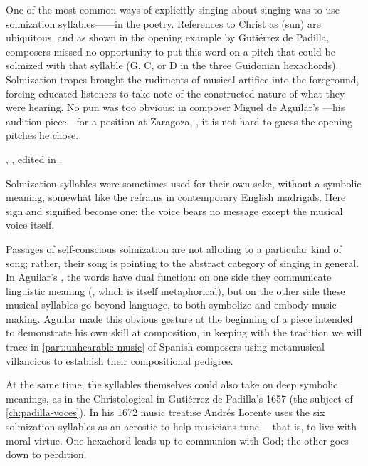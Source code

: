 One of the most common ways of explicitly singing about singing was to use
solmization syllables------in the poetry.
References to Christ as  (sun) are ubiquitous, and as shown in the
opening example by Gutiérrez de Padilla, composers missed no opportunity to put
this word on a pitch that could be solmized with that syllable (G, C, or D in
the three Guidonian hexachords).
Solmization tropes brought the rudiments of musical artifice into the
foreground, forcing educated listeners to take note of the constructed nature
of what they were hearing.
No pun was too obvious: in composer Miguel de Aguilar's ---his
audition piece---for a position at Zaragoza, , it
is not hard to guess the opening pitches he chose.%
\begin{Footnote}
    , , edited
    in \autocite[34--64]{Ezquerro:MME55}.
\end{Footnote}
Solmization syllables were sometimes used for their own sake, without a
symbolic meaning, somewhat like the  refrains in contemporary
English madrigals.
Here sign and signified become one: the voice bears no message except the
musical voice itself.

Passages of self-conscious solmization are not alluding to a particular kind of
song; rather, their song is pointing to the abstract category of
singing in general.
In Aguilar's , the words have dual function: on one side
they communicate linguistic meaning (, which is itself
metaphorical), but on the other side these musical syllables go beyond
language, to both symbolize and embody music-making. 
Aguilar made this obvious gesture at the beginning of a piece intended to
demonstrate his own skill at composition, in keeping with the tradition we will
trace in \cref{part:unhearable-music} of Spanish composers using metamusical
villancicos to establish their compositional pedigree.

At the same time, the syllables themselves could also take on deep symbolic
meanings, as in the Christological  in
Gutiérrez de Padilla's 1657  (the subject of
\cref{ch:padilla-voces}).
In his 1672 music treatise Andrés Lorente uses the six solmization syllables as
an acrostic to help musicians tune ---that is, to live with moral virtue.%
    \Autocite[689]{Lorente:Porque}
One hexachord leads up to communion with God; the other goes down to perdition.

